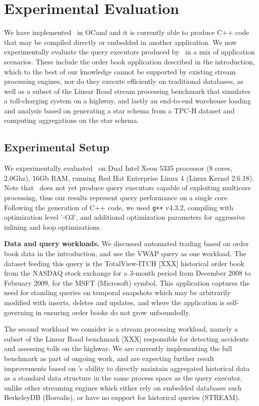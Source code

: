 \section{Experimental Evaluation}

We have implemented \compiler\ in OCaml and it is currently able to produce C++
code that may be compiled directly or embedded in another application. We now
experimentally evaluate the query executors produced by \compiler\ in a mix of
application scenarios. These include the order book application described in the
introduction, which to the best of our knowledge cannot be supported by existing
stream processing engines, nor do they execute efficiently on traditional
databases, as well as a subset of the Linear Road stream processing benchmark
that simulates a toll-charging system on a highway, and lastly an end-to-end
warehouse loading and analysis based on generating a star schema from a TPC-H
dataset and computing aggregations on the star schema.

\subsection{Experimental Setup}
We experimentally evaluated \compiler\ on Dual Intel Xeon 5335 processor (8
cores, 2.0Ghz), 16Gb RAM, running Red Hat Enterprise Linux 4 (Linux Kernel
2.6.18). Note that \compiler\ does not yet produce query executors capable of
exploiting multicore processing, thus our results represent query performance on
a single core. Following the generation of C++ code, we used \texttt{g++} v4.3.2,
compiling with optimization level '-O3', and additional optimization parameters
for aggressive inlining and loop optimizations.

\textbf{Data and query workloads.}
We discussed automated trading based on order book data in the introduction,
and use the VWAP query as one workload. The dataset feeding this query is the
TotalView-ITCH [XXX] historical order book from the NASDAQ stock exchange for a
3-month period from December 2008 to February 2009, for the MSFT (Microsoft)
symbol. This application captures the need for standing queries on temporal
snapshots which may be arbitrarily modified with inserts, deletes and updates,
and where the application is self-governing in ensuring order books do not grow
unboundedly.

The second workload we consider is a stream processing workload,
namely a subset of the Linear Road benchmark [XXX] responsible for detecting
accidents and assessing tolls on the highway. We are currently implementing the
full benchmark as part of ongoing work, and are expecting further
result improvements based on \compiler's ability to directly maintain
aggregated historical data as a standard data structure in the same process
space as the query executor, unlike other streaming engines which either rely
on embedded databases such BerkeleyDB (Borealis), or have no support for
historical queries (STREAM).

